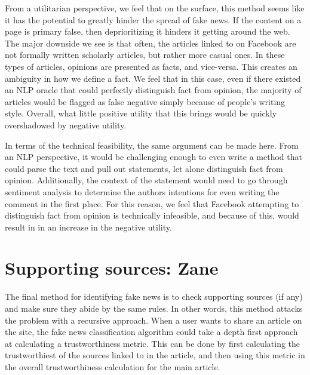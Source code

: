 \documentclass[12pt]{article}
\begin{document}
From a utilitarian perspective, we feel that on the surface, this method seems like it has the potential to greatly hinder the spread of fake news. If the content on a page is primary false, then deprioritizing it hinders it getting around the web. The major downside we see is that often, the articles linked to on Facebook are not formally written scholarly articles, but rather more casual ones. In these types of articles, opinions are presented as facts, and vice-versa. This creates an ambiguity in how we define a fact. We feel that in this case, even if there existed an NLP oracle that could perfectly distinguish fact from opinion, the majority of articles would be flagged as false negative simply because of people's writing style. Overall, what little positive utility that this brings would be quickly overshadowed by negative utility.

In terms of the technical feasibility, the same argument can be made here. From an NLP perspective, it would be challenging enough to even write a method that could parse the text and pull out statements, let alone distinguish fact from opinion. Additionally, the context of the statement would need to go through sentiment analysis to determine the authors intentions for even writing the comment in the first place. For this reason, we feel that Facebook attempting to distinguish fact from opinion is technically infeasible, and because of this, would result in in an increase in the negative utility.

\section{Supporting sources: Zane}
The final method for identifying fake news is to check supporting sources (if any) and make sure they abide by the same rules. In other words, this method attacks the problem with a recursive approach. When a user wants to share an article on the site, the fake news classification algorithm could take a depth first approach at calculating a trustworthiness metric. This can be done by first calculating the trustworthiest of the sources linked to in the article, and then using this metric in the overall trustworthiness calculation for the main article.
\end{document}

